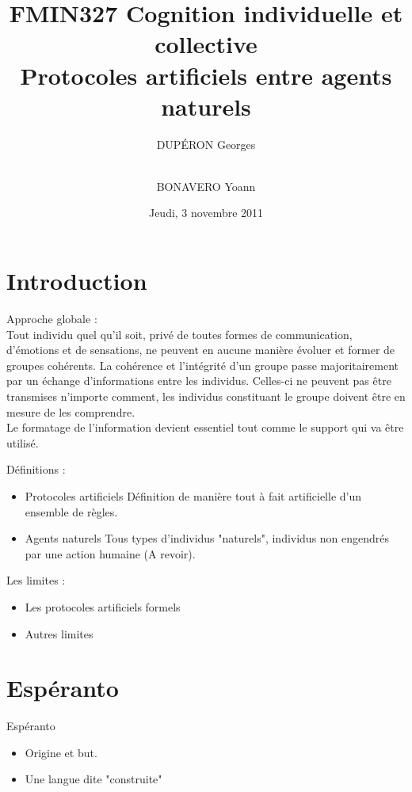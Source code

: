 \documentclass{beamer}
\title{FMIN327 Cognition individuelle et collective\\ Protocoles artificiels entre agents naturels}
\author{DUPÉRON Georges \and\\ BONAVERO Yoann}
\institute{Université Montpellier II, Département informatique  \\ Master 2 IFPRU \\ Sous la direction de Monsieur Jacques Ferber}
\date{Jeudi, 3 novembre 2011}
\renewcommand*{\figurename}{}
\begin{document}
\renewcommand*{\figurename}{}

\begin{frame}
  \titlepage
\end{frame}

\section{Introduction}

\begin{frame}
Approche globale :
\\ Tout individu quel qu'il soit, privé de toutes formes de communication, d'émotions et de sensations, ne peuvent
en aucune manière évoluer et former de groupes cohérents. La cohérence et l'intégrité d'un groupe passe majoritairement
par un échange d'informations entre les individus. Celles-ci ne peuvent pas être transmises n'importe
comment, les individus constituant le groupe doivent être en mesure de les comprendre.
\\ Le formatage de l'information devient essentiel tout comme le support qui va être utilisé.
\newline 
\end{frame}

\begin{frame}
Définitions :
\begin{itemize}
	\item Protocoles artificiels
	Définition de manière tout à fait artificielle d'un ensemble de règles.
	\item Agents naturels
	Tous types d'individus "naturels", individus non engendrés par une action humaine (A revoir).
\end{itemize}
\end{frame}

\begin{frame}
Les limites :
\begin{itemize}
	\item Les protocoles artificiels formels
	\item Autres limites
\end{itemize}
\end{frame}

\section{Espéranto}

\begin{frame}
\begin{center}
\huge Espéranto
\end{center}
\begin{itemize}
\item Origine et but.
\item Une langue dite "construite"
\end{itemize}
\end{frame}
\end{document}
